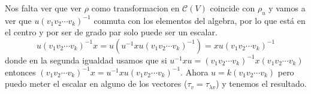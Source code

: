 \documentclass[12pt]{amsart}
\newcommand{\QQ}{\mathbb{Q}}
\newcommand{\cont}{\mathcal{C}}
\newcommand{\lp}{\left(}
\newcommand{\rp}{\right)}
\theoremstyle{plain}
\begin{document}
Nos falta ver que ver $\rho$ como transformacion en $\cont(V)$ 
coincide con $\rho_u$ y vamos a ver que $u(v_1v_2\cdots v_k)^{-1}$
conmuta con los elementos del algebra, por lo que está en el centro
y por ser de grado par solo puede ser un escalar.
$$u(v_1v_2\cdots v_k)^{-1}x =u\lp u^{-1}xu(v_1v_2\cdots v_k)^{-1}\rp 
= xu(v_1v_2\cdots v_k)^{-1}$$
donde en la segunda igualdad usamos que si $u^{-1}xu=
(v_1v_2\cdots v_k)^{-1}x(v_1v_2\cdots v_k)$ entonces 
$(v_1v_2\cdots v_k)^{-1}x = u^{-1}xu(v_1v_2\cdots v_k)^{-1}$.
Ahora $u=k(v_1v_2\cdots v_k)$ pero puedo meter el escalar en alguno
de los vectores ($\tau_v=\tau_{\lambda v}$) y tenemos el resultado.










\end{document}
